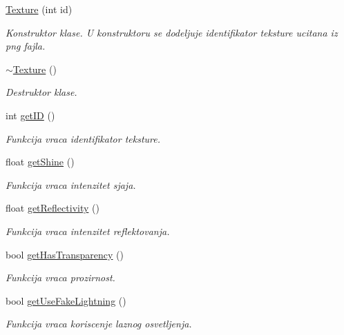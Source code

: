 \begin{DoxyCompactItemize}
\item 
\hyperlink{classtexture_1_1Texture_a3de34511b42d770506bddaa58875eb3d}{Texture} (int id)
\begin{DoxyCompactList}\small\item\em Konstruktor klase. U konstruktoru se dodeljuje identifikator teksture ucitana iz png fajla. \end{DoxyCompactList}\item 
\hyperlink{classtexture_1_1Texture_a78ee86dc34523d645ea009de0b01ed45}{$\sim$\+Texture} ()
\begin{DoxyCompactList}\small\item\em Destruktor klase. \end{DoxyCompactList}\item 
int \hyperlink{classtexture_1_1Texture_ad68f41e90862c73b209743625b64dffa}{get\+ID} ()
\begin{DoxyCompactList}\small\item\em Funkcija vraca identifikator teksture. \end{DoxyCompactList}\item 
float \hyperlink{classtexture_1_1Texture_a9a7667b3a055b2e0c27c2490d4ab4e7e}{get\+Shine} ()
\begin{DoxyCompactList}\small\item\em Funkcija vraca intenzitet sjaja. \end{DoxyCompactList}\item 
float \hyperlink{classtexture_1_1Texture_a0c2fb82845e340acced35d96a80bbb25}{get\+Reflectivity} ()
\begin{DoxyCompactList}\small\item\em Funkcija vraca intenzitet reflektovanja. \end{DoxyCompactList}\item 
bool \hyperlink{classtexture_1_1Texture_af200f2548ab2379026b6b234d53e6e18}{get\+Has\+Transparency} ()
\begin{DoxyCompactList}\small\item\em Funkcija vraca prozirnost. \end{DoxyCompactList}\item 
bool \hyperlink{classtexture_1_1Texture_adba4e7c4fa1d9cf6691af081c63bf962}{get\+Use\+Fake\+Lightning} ()
\begin{DoxyCompactList}\small\item\em Funkcija vraca koriscenje laznog osvetljenja. \end{DoxyCompactList}\item 

\end{DoxyCompactItemize}
